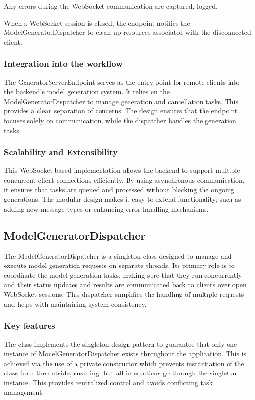 				Any errors during the WebSocket communication are captured, logged.

				When a WebSocket session is closed, the endpoint notifies the ModelGeneratorDispatcher to clean up resources associated with the disconnected client.

			\subsubsection{Integration into the workflow} \label{Integration into the workflow}
				The GeneratorServerEndpoint serves as the entry point for remote clients into the backend's model generation system. 
				It relies on the ModelGeneratorDispatcher to manage generation and cancellation tasks. This provides a clean separation of concerns. 
				The design ensures that the endpoint focuses solely on communication, while the dispatcher handles the generation tasks.

			\subsubsection{Scalability and Extensibility} \label{Scalability and Extensibility}
				This WebSocket-based implementation allows the backend to support multiple concurrent client connections efficiently. 
				By using asynchronous communication, it ensures that tasks are queued and processed without blocking the ongoing generations. 
				The modular design makes it easy to extend functionality, such as adding new message types or enhancing error handling mechanisms.


		\subsection{ModelGeneratorDispatcher} \label{ModelGeneratorDispatcher}
			The ModelGeneratorDispatcher is a singleton class designed to manage and execute model generation requests on separate threads. 
			Its primary role is to coordinate the model generation tasks, making sure that they run concurrently and their status updates and results are 
			communicated back to clients over open WebSocket sessions. This dispatcher simplifies the handling of multiple requests 
			and helps with maintaining system consistency.

			\subsubsection{Key features} \label{Key features}
			The class implements the singleton design pattern to guarantee that only one instance of ModelGeneratorDispatcher exists throughout the application. 
			This is achieved via the use of a private constructor which prevents instantiation of the class from the outside, ensuring 
			that all interactions go through the singleton instance.
			This provides centralized control and avoids conflicting task management.


